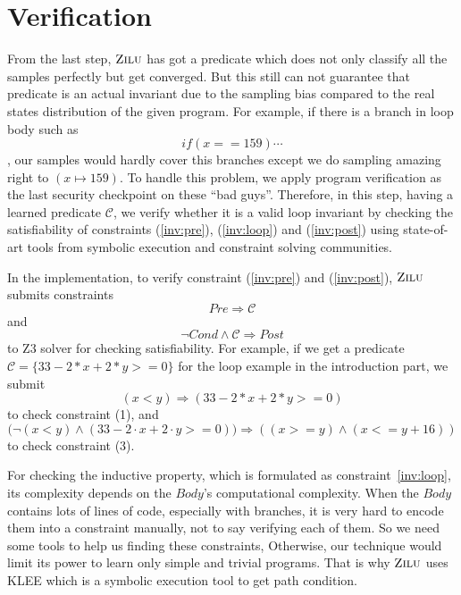 
\section{Verification} %
\label{sec:verification}
From the last step, $\textsc{Zilu}$ has got a predicate which does not only classify all the samples perfectly but get converged.
But this still can not guarantee that predicate is an actual invariant due to the sampling bias compared to the real states distribution of the given program.
For example, if there is a branch in loop body such as $$if (x == 159) \cdots$$, 
our samples would hardly cover this branches except we do sampling amazing right to $(x\mapsto 159)$.
To handle this problem, we apply program verification as the last security checkpoint on these ``bad guys''.
Therefore, in this step, having a learned predicate $\mathcal{C}$, we verify whether it is a valid loop invariant by
checking the satisfiability of constraints (\ref{inv:pre}), (\ref{inv:loop}) and (\ref{inv:post}) using state-of-art tools 
from symbolic execution and constraint solving communities.

In the implementation, to verify constraint (\ref{inv:pre}) and (\ref{inv:post}), 
$\textsc{Zilu}$ submits constraints 
$$Pre \Rightarrow \mathcal{C}$$ 
and 
$$\neg {Cond} \wedge \mathcal{C} \Rightarrow Post$$
to Z3 solver for checking satisfiability.
For example, if we get a predicate $\mathcal{C} = \{33-2*x+2*y>=0\}$
for the loop example in the introduction part, 
we submit 
$$(x<y) \Rightarrow (33-2*x+2*y>=0)$$
to check constraint (1), 
and 
$$\big(\neg(x<y) \wedge (33-2\cdot x+2\cdot y>=0)\big) \Rightarrow ((x >= y) \wedge (x <= y + 16))$$
to check constraint (3).

For checking the inductive property, which is formulated as constraint~\ref{inv:loop},
its complexity depends on the $Body$'s computational complexity.
When the $Body$ contains lots of lines of code, especially with branches, 
it is very hard to encode them into a constraint manually,
not to say verifying each of them.
So we need some tools to help us finding these constraints, 
Otherwise, our technique would limit its power to learn only simple and trivial programs. 
That is why $\textsc{Zilu}$ uses KLEE\cite{cadar2008klee} which is a symbolic execution tool to get path condition.

